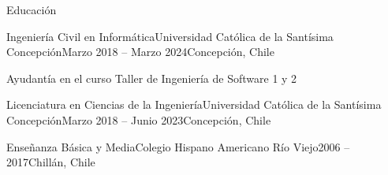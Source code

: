 \begin{section}{Educación}

    \begin{subsection}{Ingeniería Civil en Informática}{Universidad Católica de la Santísima Concepción}{Marzo 2018 -- Marzo 2024}{Concepción, Chile}
    {
    \item{Ayudantía en el curso Taller de Ingeniería de Software 1 y 2} 
    }
    \end{subsection}

    \begin{subsection}{Licenciatura en Ciencias de la Ingeniería}{Universidad Católica de la Santísima Concepción}{Marzo 2018 -- Junio 2023}{Concepción, Chile}
    {}
    \end{subsection}
    
    \begin{subsection}{Enseñanza Básica y Media}{Colegio Hispano Americano Río Viejo}{2006 -- 2017}{Chillán, Chile} 
    {}
    \end{subsection}
    
\end{section}